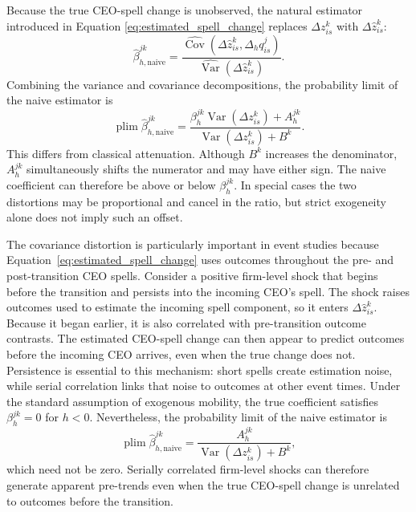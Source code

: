 \documentclass[sigconf,nonacm]{acmart}
\begin{document}
Because the true CEO-spell change is unobserved, the natural estimator introduced in Equation \ref{eq:estimated_spell_change}
replaces $\Delta z_{is}^{k}$ with $\Delta\widehat z_{is}^{k}$:
\begin{equation}
\widehat\beta_{h,\mathrm{naive}}^{jk}
=
\frac{
\widehat{\operatorname{Cov}}\!\left(
\Delta\widehat z_{is}^{k},
\Delta_h q_{is}^{j}
\right)
}{
\widehat{\operatorname{Var}}\!\left(
\Delta\widehat z_{is}^{k}
\right)
}.
\label{eq:naive_beta}
\end{equation}
Combining the variance and covariance decompositions, the probability
limit of the naive estimator is
\begin{equation}
\operatorname{plim}
\widehat\beta_{h,\mathrm{naive}}^{jk}
=
\frac{
\beta_h^{jk}
\operatorname{Var}\!\left(
\Delta z_{is}^{k}
\right)
+
A_h^{jk}
}{
\operatorname{Var}\!\left(
\Delta z_{is}^{k}
\right)
+
B^{k}
}.
\label{eq:naive_beta_plim}
\end{equation}
This differs from classical attenuation. Although $B^k$ increases the denominator, $A_h^{jk}$ simultaneously shifts the numerator and may have either sign. The naive coefficient can therefore be above or below $\beta_h^{jk}$. In special cases the two distortions may be proportional and cancel in the ratio, but strict exogeneity alone does not imply such an offset.

The covariance distortion is particularly important in event studies because Equation~\eqref{eq:estimated_spell_change} uses outcomes throughout the pre- and post-transition CEO spells. Consider a positive firm-level shock that begins before the transition and persists into the incoming CEO's spell. The shock raises outcomes used to estimate the incoming spell component, so it enters $\Delta\widehat z_{is}^{k}$. Because it began earlier, it is also correlated with pre-transition outcome contrasts. The estimated CEO-spell change can then appear to predict outcomes before the incoming CEO arrives, even when the true change does not. Persistence is essential to this mechanism: short spells create estimation noise, while serial correlation links that noise to outcomes at other event times. Under the standard assumption of exogenous mobility, the true coefficient satisfies $\beta_h^{jk}=0$ for $h<0$. Nevertheless, the probability limit of the naive estimator is
\begin{equation}
\operatorname{plim}
\widehat\beta_{h,\mathrm{naive}}^{jk}
=
\frac{
A_h^{jk}
}{
\operatorname{Var}\!\left(
\Delta z_{is}^{k}
\right)
+
B^{k}
},
\label{eq:pretrend_bias}
\end{equation}
which need not be zero. Serially correlated firm-level shocks can
therefore generate apparent pre-trends even when the true CEO-spell
change is unrelated to outcomes before the transition.
\end{document}
